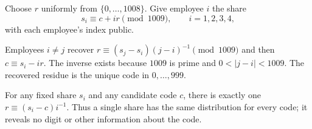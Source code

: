 Choose $r$ uniformly from $\{0,\ldots,1008\}$. Give employee $i$ the share
\[
s_i\equiv c+ir\pmod{1009},\qquad i=1,2,3,4,
\]
with each employee's index public.

Employees $i\ne j$ recover $r\equiv(s_j-s_i)(j-i)^{-1}\pmod{1009}$ and then $c\equiv s_i-ir$. The inverse exists because $1009$ is prime and $0<|j-i|<1009$. The recovered residue is the unique code in $0,\ldots,999$.

For any fixed share $s_i$ and any candidate code $c$, there is exactly one $r\equiv(s_i-c)i^{-1}$. Thus a single share has the same distribution for every code; it reveals no digit or other information about the code.
